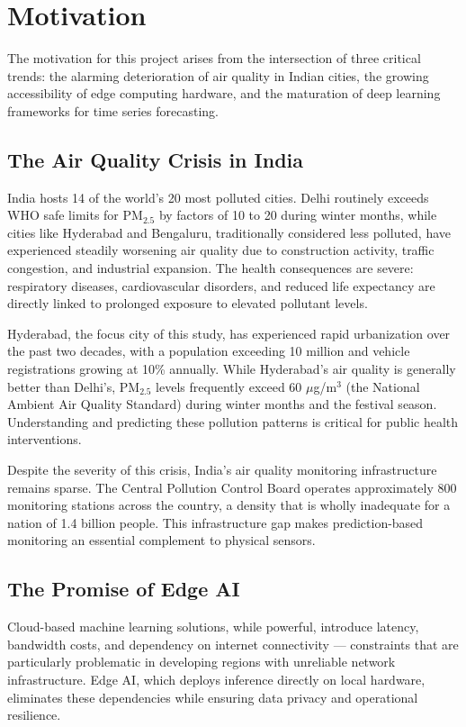 \section{Motivation}

The motivation for this project arises from the intersection of three critical trends: the alarming deterioration of air quality in Indian cities, the growing accessibility of edge computing hardware, and the maturation of deep learning frameworks for time series forecasting.

\subsection{The Air Quality Crisis in India}

India hosts 14 of the world's 20 most polluted cities. Delhi routinely exceeds WHO safe limits for PM$_{2.5}$ by factors of 10 to 20 during winter months, while cities like Hyderabad and Bengaluru, traditionally considered less polluted, have experienced steadily worsening air quality due to construction activity, traffic congestion, and industrial expansion. The health consequences are severe: respiratory diseases, cardiovascular disorders, and reduced life expectancy are directly linked to prolonged exposure to elevated pollutant levels.

Hyderabad, the focus city of this study, has experienced rapid urbanization over the past two decades, with a population exceeding 10 million and vehicle registrations growing at 10\% annually. While Hyderabad's air quality is generally better than Delhi's, PM$_{2.5}$ levels frequently exceed 60 $\mu$g/m$^3$ (the National Ambient Air Quality Standard) during winter months and the festival season. Understanding and predicting these pollution patterns is critical for public health interventions.

Despite the severity of this crisis, India's air quality monitoring infrastructure remains sparse. The Central Pollution Control Board operates approximately 800 monitoring stations across the country, a density that is wholly inadequate for a nation of 1.4 billion people. This infrastructure gap makes prediction-based monitoring an essential complement to physical sensors.

\subsection{The Promise of Edge AI}

Cloud-based machine learning solutions, while powerful, introduce latency, bandwidth costs, and dependency on internet connectivity --- constraints that are particularly problematic in developing regions with unreliable network infrastructure. Edge AI, which deploys inference directly on local hardware, eliminates these dependencies while ensuring data privacy and operational resilience.

